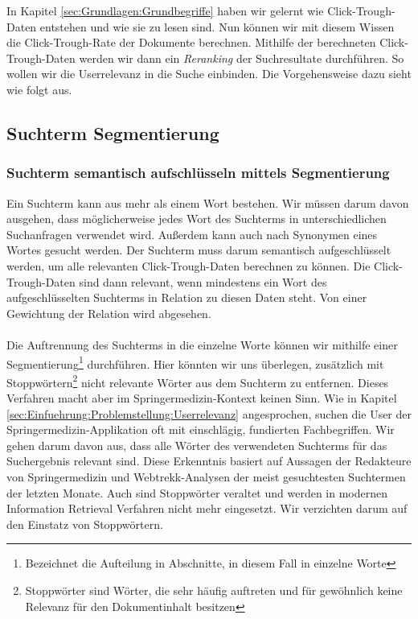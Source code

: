 In Kapitel \ref{sec:Grundlagen:Grundbegriffe} haben wir gelernt wie Click-Trough-Daten entstehen und wie sie zu lesen sind. Nun können wir mit diesem Wissen die Click-Trough-Rate der Dokumente berechnen. Mithilfe der berechneten Click-Trough-Daten werden wir dann ein \textit{Reranking} der Suchresultate durchführen. So wollen wir die Userrelevanz in die Suche einbinden. Die Vorgehensweise dazu sieht wie folgt aus.

\subsection{Suchterm Segmentierung}
\label{sec:Reranking:Methodik:SuchtermSegmentierung}

\subsubsection{Suchterm semantisch aufschlüsseln mittels Segmentierung}
\label{sec:Reranking:Methodik:SuchtermSegmentierung:SuchtermSegmentierung}

Ein Suchterm kann aus mehr als einem Wort bestehen. Wir müssen darum davon ausgehen, dass möglicherweise jedes Wort des Suchterms in unterschiedlichen Suchanfragen verwendet wird. Außerdem kann auch nach Synonymen eines Wortes gesucht werden. Der Suchterm muss darum semantisch aufgeschlüsselt werden, um alle relevanten Click-Trough-Daten berechnen zu können. Die Click-Trough-Daten sind dann relevant, wenn mindestens ein Wort des aufgeschlüsselten Suchterms in Relation zu diesen Daten steht. Von einer Gewichtung der Relation wird abgesehen.
\\
\\
Die Auftrennung des Suchterms in die einzelne Worte können wir mithilfe einer Segmentierung\footnote{Bezeichnet die Aufteilung in Abschnitte, in diesem Fall in einzelne Worte} durchführen. Hier könnten wir uns überlegen, zusätzlich mit Stoppwörtern\footnote{Stoppwörter sind Wörter, die sehr häufig auftreten und für gewöhnlich keine Relevanz für den Dokumentinhalt besitzen} nicht relevante Wörter aus dem Suchterm zu entfernen. Dieses Verfahren macht aber im Springermedizin-Kontext keinen Sinn. Wie in Kapitel \ref{sec:Einfuehrung:Problemstellung:Userrelevanz} angesprochen, suchen die User der Springermedizin-Applikation oft mit einschlägig, fundierten Fachbegriffen. Wir gehen darum davon aus, dass alle Wörter des verwendeten Suchterms für das Suchergebnis relevant sind. Diese Erkenntnis basiert auf Aussagen der Redakteure von Springermedizin und Webtrekk-Analysen der meist gesuchtesten Suchtermen der letzten Monate. Auch sind Stoppwörter veraltet und werden in modernen Information Retrieval Verfahren nicht mehr eingesetzt. Wir verzichten darum auf den Einstatz von Stoppwörtern.

